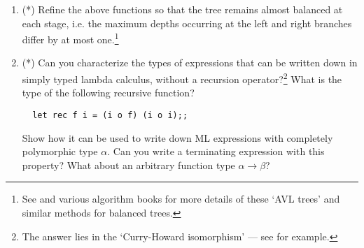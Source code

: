 \begin{enumerate}
\item (*) Refine the above functions so that the tree remains almost balanced
at each stage, i.e. the maximum depths occurring at the left and right branches
differ by at most one.\footnote{See  and various algorithm books for
more details of these `AVL trees' and similar methods for balanced trees.}

\item (*) Can you characterize the types of expressions that can be written
down in simply typed lambda calculus, without a recursion
operator?\footnote{The answer lies in the `Curry-Howard isomorphism' --- see
 for example.} What is the type of the following recursive
function?

\begin{boxed}\begin{lstlisting}
  let rec f i = (i o f) (i o i);;
\end{lstlisting}\end{boxed}

Show how it can be used to write down ML expressions with completely
polymorphic type $\alpha$. Can you write a terminating expression with this
property? What about an arbitrary function type $\alpha \to \beta$?

\end{enumerate}



